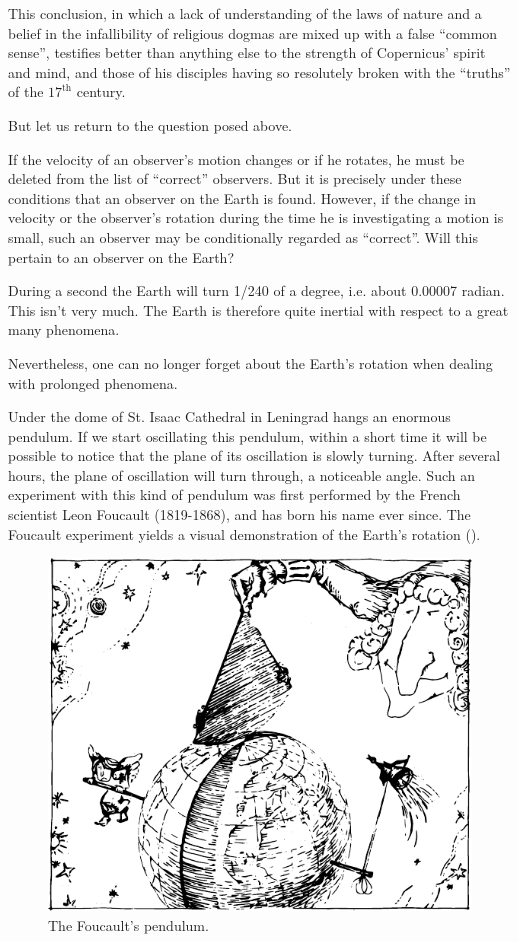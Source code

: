 This conclusion, in which a lack of understanding of the
laws of nature and a belief in the infallibility of religious
dogmas are mixed up with a false ``common sense'', testifies better than anything else to the strength of Copernicus' spirit and mind, and those of his disciples having so resolutely broken with the ``truths'' of the $17^{\textrm{th}}$ century.

But let us return to the question posed above.

If the velocity of an observer's motion changes or if
he rotates, he must be deleted from the list of ``correct''
observers. But it is precisely under these conditions that
an observer on the Earth is found. However, if the change
in velocity or the observer's rotation during the time
he is investigating a motion is small, such an observer
may be conditionally regarded as ``correct''. Will this
pertain to an observer on the Earth?

During a second the Earth will turn 1/240 of a degree,
i.e. about \num{0.00007} radian. This isn't very much. The
Earth is therefore quite inertial with respect to a great
many phenomena.

Nevertheless, one can no longer forget about the Earth's rotation when dealing with prolonged phenomena. 

Under the dome of St. Isaac Cathedral in Leningrad hangs an enormous pendulum. If we start oscillating this pendulum, within a short time it will be possible to notice that the plane of its oscillation is slowly turning. After several hours, the plane of oscillation will turn through, a noticeable angle. Such an experiment with this kind of pendulum was first performed by the French scientist Leon Foucault (1819-1868), and has born his name ever since. The Foucault experiment yields a visual demonstration of the Earth's rotation ().
\begin{figure}[!ht]
\centering
\includegraphics[width=\textwidth]{figures/fig-02-01.pdf}
\caption{The Foucault's pendulum.}
\label{fig-2.01}
\end{figure}

